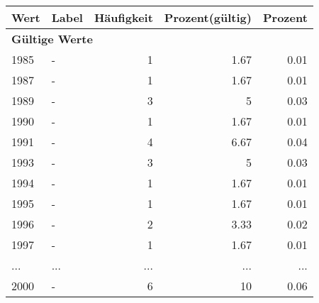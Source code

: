      \begin{longtable}{lXrrr}
     \toprule
     \textbf{Wert} & \textbf{Label} & \textbf{Häufigkeit} & \textbf{Prozent(gültig)} & \textbf{Prozent} \\
     \endhead
     \midrule
     \multicolumn{5}{l}{\textbf{Gültige Werte}}\\
        1985 & \multicolumn{1}{X}{-} & %
          \num{1} &
          \num[round-mode=places,round-precision=2]{1.67} &
          \num[round-mode=places,round-precision=2]{0.01} \\
        1987 & \multicolumn{1}{X}{-} & %
          \num{1} &
          \num[round-mode=places,round-precision=2]{1.67} &
          \num[round-mode=places,round-precision=2]{0.01} \\
        1989 & \multicolumn{1}{X}{-} & %
          \num{3} &
          \num[round-mode=places,round-precision=2]{5} &
          \num[round-mode=places,round-precision=2]{0.03} \\
        1990 & \multicolumn{1}{X}{-} & %
          \num{1} &
          \num[round-mode=places,round-precision=2]{1.67} &
          \num[round-mode=places,round-precision=2]{0.01} \\
        1991 & \multicolumn{1}{X}{-} & %
          \num{4} &
          \num[round-mode=places,round-precision=2]{6.67} &
          \num[round-mode=places,round-precision=2]{0.04} \\
        1993 & \multicolumn{1}{X}{-} & %
          \num{3} &
          \num[round-mode=places,round-precision=2]{5} &
          \num[round-mode=places,round-precision=2]{0.03} \\
        1994 & \multicolumn{1}{X}{-} & %
          \num{1} &
          \num[round-mode=places,round-precision=2]{1.67} &
          \num[round-mode=places,round-precision=2]{0.01} \\
        1995 & \multicolumn{1}{X}{-} & %
          \num{1} &
          \num[round-mode=places,round-precision=2]{1.67} &
          \num[round-mode=places,round-precision=2]{0.01} \\
        1996 & \multicolumn{1}{X}{-} & %
          \num{2} &
          \num[round-mode=places,round-precision=2]{3.33} &
          \num[round-mode=places,round-precision=2]{0.02} \\
        1997 & \multicolumn{1}{X}{-} & %
          \num{1} &
          \num[round-mode=places,round-precision=2]{1.67} &
          \num[round-mode=places,round-precision=2]{0.01} \\
       ... & ... & ... & ... & ... \\
        2000 & \multicolumn{1}{X}{-} & %
          \num{6} &
          \num[round-mode=places,round-precision=2]{10} &
          \num[round-mode=places,round-precision=2]{0.06} \\


\end{longtable}
